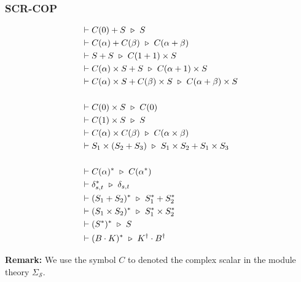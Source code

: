 \subsubsection*{\textsf{SCR-COP}}
\begin{align*}
  & \vdash C(0) + S \ \triangleright\  S \\
  & \vdash C(\alpha) + C(\beta) \ \triangleright\  C(\alpha + \beta) \\
  & \vdash S + S \ \triangleright\  C(1 + 1) \times S \\
  & \vdash C(\alpha) \times S + S \ \triangleright\  C(\alpha + 1) \times S \\
  & \vdash C(\alpha) \times S + C(\beta) \times S \ \triangleright\  C(\alpha + \beta) \times S
  \\
  \\
  & \vdash C(0) \times S \ \triangleright\  C(0) \\
  & \vdash C(1) \times S \ \triangleright\  S \\
  & \vdash C(\alpha) \times C(\beta) \ \triangleright\  C(\alpha \times \beta) \\
  & \vdash S_1 \times (S_2 + S_3) \ \triangleright\  S_1 \times S_2 + S_1 \times S_3
  \\
  \\
  & \vdash C(\alpha)^* \ \triangleright\  C(\alpha^*) \\
  & \vdash \delta_{s, t}^* \ \triangleright\  \delta_{s, t} \\
  & \vdash (S_1 + S_2)^* \ \triangleright\  S_1^* + S_2^* \\
  & \vdash (S_1 \times S_2)^* \ \triangleright\  S_1^* \times S_2^* \\
  & \vdash (S^*)^* \ \triangleright\  S \\
  & \vdash (B \cdot K)^* \ \triangleright\  K^\dagger \cdot B^\dagger
\end{align*}

\textbf{Remark: } We use the symbol $C$ to denoted the complex scalar in the module theory $\Sigma_\mathcal{S}$.



